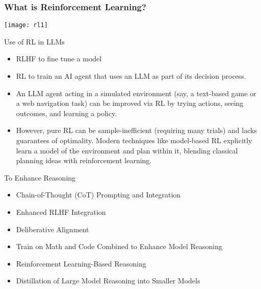 \begin{frame}[fragile]\frametitle{What is Reinforcement Learning?}
		\begin{center}
		\texttt{[image: rl1]}
		\end{center}

\end{frame}


\begin{frame}[fragile]{Use of RL in LLMs}


    \begin{itemize}
        \item  RLHF to fine tune a model
		\item RL to train an AI agent that uses an LLM as part of its decision process.
		\item An LLM agent acting in a simulated environment (say, a text-based 
game or a web navigation task) can be improved via RL by trying actions, 
seeing outcomes, and learning a policy. 
		\item However, pure RL can be sample-inefficient (requiring many trials) and 
lacks guarantees of optimality. Modern techniques like model-based RL 
explicitly learn a model of the environment and plan within it, blending 
classical planning ideas with reinforcement learning.
    \end{itemize}
\end{frame}


\begin{frame}[fragile]{To Enhance Reasoning}


    \begin{itemize}
        \item  Chain-of-Thought (CoT) Prompting and Integration
        \item  Enhanced RLHF Integration
        \item  Deliberative Alignment
        \item  Train on Math and Code Combined to  Enhance Model Reasoning
        \item  Reinforcement Learning-Based Reasoning
        \item  Distillation of Large Model Reasoning into Smaller Models
    \end{itemize}
\end{frame}
